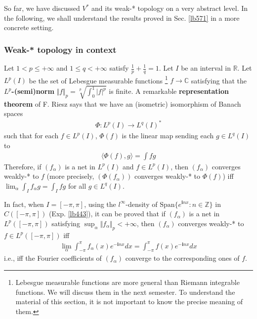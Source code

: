 \documentclass[12pt,b5paper,notitlepage]{article}
\theoremstyle{definition}
\theoremstyle{plain}
\newcommand{\Span}{\mathrm{Span}}
\newcommand{\bk}[1]{\langle {#1}\rangle}
\newcommand{\im}{\mathbf{i}}
\newcommand{\Cbb}{\mathbb C}
\newcommand{\Zbb}{\mathbb Z}
\newcommand{\Rbb}{\mathbb R}
\numberwithin{equation}{section}
\begin{document}
So far, we have discussed $V^*$ and its weak-* topology on a very abstract level. In the following, we shall understand the results proved in Sec. \ref{lb571} in a more concrete setting.

\subsubsection{Weak-* topology in context}

Let $1<p\leq +\infty$ and $1\leq q<+\infty$ satisfy $\frac 1p+\frac 1q=1$. Let $I$ be an interval in $\Rbb$. Let $L^p(I)$ be the set of Lebesgue measurable functions \footnote{Lebesgue measurable functions are more general than Riemann integrable functions. We will discuss them in the next semester. To understand the material of this section, it is not important to know the precise meaning of them.} $f\rightarrow\Cbb$ satisfying that the \textbf{$L^p$-(semi)norm} $\Vert f\Vert_p=\sqrt[p]{\int_0^1 |f|^p}$ is finite. A remarkable \textbf{representation theorem} of F. Riesz says that we have an (isometric) isomorphism of Banach spaces
\begin{align*}
\Phi:L^p(I)\rightarrow L^q(I)^*
\end{align*}
such that for each $f\in L^p(I)$, $\Phi(f)$ is the linear map sending each $g\in L^q(I)$ to
\begin{align*}
\bk{\Phi(f),g}=\int fg
\end{align*}
Therefore, if $(f_\alpha)$ is a net in $L^p(I)$ and $f\in L^p(I)$, then $(f_\alpha)$ converges weakly-* to $f$ (more precisely, $(\Phi(f_\alpha))$ converges weakly-* to $\Phi(f)$) iff $\lim_\alpha\int_I f_\alpha g=\int_I fg$ for all $g\in L^q(I)$. 

In fact, when $I=[-\pi,\pi]$, using the $l^\infty$-density of $\Span\{e^{\im nx}:n\in\Zbb\}$ in $C([-\pi,\pi])$ (Exp. \ref{lb443}), it can be proved that if $(f_\alpha)$ is a net in $L^p([-\pi,\pi])$ satisfying $\sup_\alpha \Vert f_\alpha\Vert_p<+\infty$, then $(f_\alpha)$ converges weakly-* to $f\in L^p([-\pi,\pi])$ iff
\begin{align*}
\lim_\alpha \int_{-\pi}^\pi f_\alpha(x)e^{-\im nx}dx=\int_{-\pi}^\pi f(x)e^{-\im nx}dx
\end{align*}
i.e., iff the Fourier coefficients of $(f_\alpha)$ converge to the corresponding ones of $f$.
\end{document}
